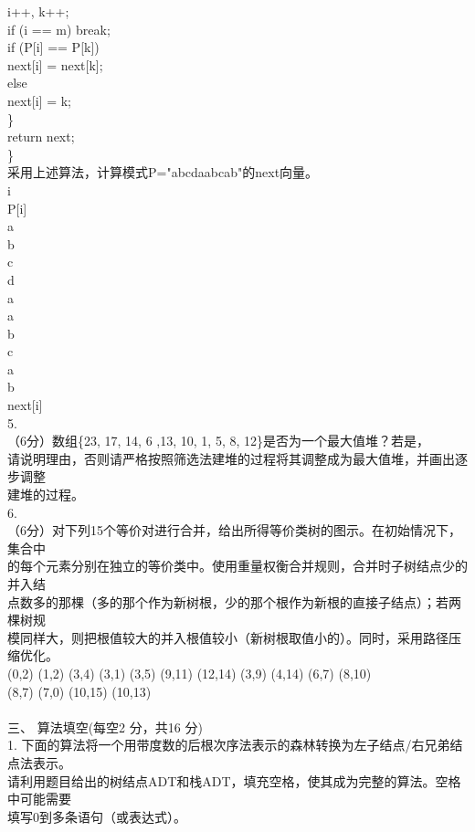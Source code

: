\begin{question}
i++, k++;\\
if (i == m) break;\\
if (P[i] == P[k])\\
next[i] = next[k];\\
else\\
next[i] = k;\\
\}\\
return next;\\
\}\\
采用上述算法，计算模式P="abcdaabcab"的next向量。\\
i\\
P[i]\\
a\\
b\\
c\\
d\\
a\\
a\\
b\\
c\\
a\\
b\\
next[i]\\
5.\\
（6分）数组\{23, 17, 14, 6 ,13, 10, 1, 5, 8, 12\}是否为一个最大值堆？若是，\\
请说明理由，否则请严格按照筛选法建堆的过程将其调整成为最大值堆，并画出逐步调整\\
建堆的过程。\\
6.\\
（6分）对下列15个等价对进行合并，给出所得等价类树的图示。在初始情况下，集合中\\
的每个元素分别在独立的等价类中。使用重量权衡合并规则，合并时子树结点少的并入结\\
点数多的那棵（多的那个作为新树根，少的那个根作为新根的直接子结点）；若两棵树规\\
模同样大，则把根值较大的并入根值较小（新树根取值小的）。同时，采用路径压缩优化。\\
(0,2) (1,2) (3,4) (3,1) (3,5) (9,11) (12,14) (3,9) (4,14) (6,7) (8,10)\\
(8,7) (7,0) (10,15) (10,13)\\
\\
三、 算法填空(每空2 分，共16 分)\\
1. 下面的算法将一个用带度数的后根次序法表示的森林转换为左子结点/右兄弟结点法表示。\\
请利用题目给出的树结点ADT和栈ADT，填充空格，使其成为完整的算法。空格中可能需要\\
填写0到多条语句（或表达式）。\\

\end{question}
